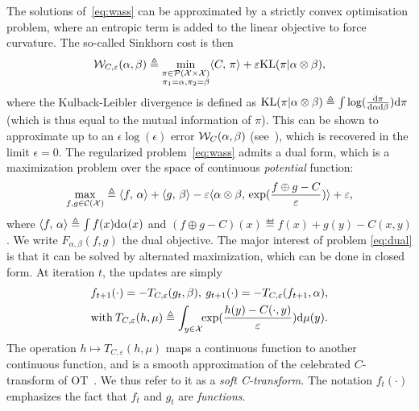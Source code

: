 The solutions of~\eqref{eq:wass} can be approximated by a strictly convex optimisation problem, where an entropic term is added to the linear objective to force curvature. The so-called Sinkhorn cost is then
\begin{equation}\label{eq:wass}
    \mathcal{W}_{C,\varepsilon}(\alpha, \beta) \triangleq 
    \min_{
    \substack{
        \pi \in \mathcal{P}(\mathcal{X} \times \mathcal{X})
        \\\pi_1 = \alpha, \pi_2 = \beta
    }    
    } \langle C,\,\pi\rangle + \varepsilon \textrm{KL}(\pi | \alpha \otimes \beta),
\end{equation}
where the Kulback-Leibler divergence is defined as $\textrm{KL}(\pi | \alpha \otimes \beta) \triangleq \int \log(\frac{\textrm{d}\pi}{\textrm{d}\alpha\textrm{d}\beta}) \textrm{d}\pi$ (which is thus equal to the mutual information of $\pi$).
%
This can be shown to approximate up to an $\epsilon \log(\epsilon)$ error $\mathcal{W}_C(\alpha,\beta)$ (see~\cite{2019-Genevay-aistats}), which is recovered in the limit $\epsilon=0$. 
%
The regularized problem~\eqref{eq:wass} admits a dual form, which is a maximization problem over the space of continuous \textit{potential} function:
\begin{equation}\label{eq:dual}
    \max_{f, g \in \mathcal{C}(\mathcal{X})}
     \triangleq \langle f,\,\alpha\rangle + \langle g,\,\beta\rangle
    - \varepsilon \langle \alpha \otimes \beta,\,\exp(\frac{f \oplus g - C}{\varepsilon})\rangle + \varepsilon, 
\end{equation}
where $\langle f,\,\alpha\rangle \triangleq \int f(x) \textrm{d}\alpha(x)$ and $(f \oplus g - C)(x)
\eqdef f(x)+g(y)-C(x,y)$. We write $F_{\alpha, \beta}(f, g)$ the dual objective. 
The major interest of problem \eqref{eq:dual} is that it can be solved by alternated maximization, which can be done in closed form. At iteration $t$, the updates are simply
\begin{align}
    &f_{t+1}(\cdot) = - T_{C,\varepsilon}(g_t, \beta), \:
    g_{t+1}(\cdot) = - T_{C,\varepsilon}(f_{t+1}, \alpha), \\
    &\text{with} \:
    T_{C,\varepsilon}(h, \mu) \triangleq 
    \int_{y \in \mathcal{X}}\!\! \exp(\frac{h(y) - C(\cdot, y)}{\varepsilon})\textrm{d} \mu(y).\label{eq:sinkhorn}
\end{align}
The operation $h \mapsto T_{C,\varepsilon}(h, \mu)$  maps a continuous function to another continuous function, and is a smooth approximation of the celebrated $C$-transform of OT~\cite{santambrogio2015optimal}. We thus refer to it as a \textit{soft C-transform}. 
%
The notation $f_t(\cdot)$ emphasizes the fact that $f_t$ and $g_t$ are \textit{functions}. 
%

